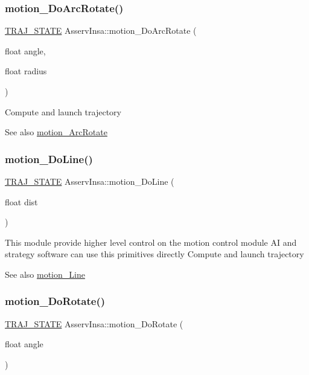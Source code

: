 \subsubsection{\texorpdfstring{motion\+\_\+\+Do\+Arc\+Rotate()}{motion\_DoArcRotate()}}
{\footnotesize\ttfamily \hyperlink{path__manager_8h_adb3360abeb29758da93865c8afcb80eb}{T\+R\+A\+J\+\_\+\+S\+T\+A\+TE} Asserv\+Insa\+::motion\+\_\+\+Do\+Arc\+Rotate (\begin{DoxyParamCaption}\item[{float}]{angle,  }\item[{float}]{radius }\end{DoxyParamCaption})}

Compute and launch trajectory \begin{DoxySeeAlso}{See also}
\hyperlink{classAsservInsa_ad243e9562a5191e34aed076e52e8fab8}{motion\+\_\+\+Arc\+Rotate} 
\end{DoxySeeAlso}
\mbox{\label{classAsservInsa_a3cb6f1cf5557851312a8398b79514905}} 
\subsubsection{\texorpdfstring{motion\+\_\+\+Do\+Line()}{motion\_DoLine()}}
{\footnotesize\ttfamily \hyperlink{path__manager_8h_adb3360abeb29758da93865c8afcb80eb}{T\+R\+A\+J\+\_\+\+S\+T\+A\+TE} Asserv\+Insa\+::motion\+\_\+\+Do\+Line (\begin{DoxyParamCaption}\item[{float}]{dist }\end{DoxyParamCaption})}

This module provide higher level control on the motion control module AI and strategy software can use this primitives directly Compute and launch trajectory \begin{DoxySeeAlso}{See also}
\hyperlink{classAsservInsa_ab0fe0ad459e394938598a8b031118edb}{motion\+\_\+\+Line} 
\end{DoxySeeAlso}
\mbox{\label{classAsservInsa_ab45e49759207b2ba9abcb17b1d567abf}} 
\subsubsection{\texorpdfstring{motion\+\_\+\+Do\+Rotate()}{motion\_DoRotate()}}
{\footnotesize\ttfamily \hyperlink{path__manager_8h_adb3360abeb29758da93865c8afcb80eb}{T\+R\+A\+J\+\_\+\+S\+T\+A\+TE} Asserv\+Insa\+::motion\+\_\+\+Do\+Rotate (\begin{DoxyParamCaption}\item[{float}]{angle }\end{DoxyParamCaption})}

